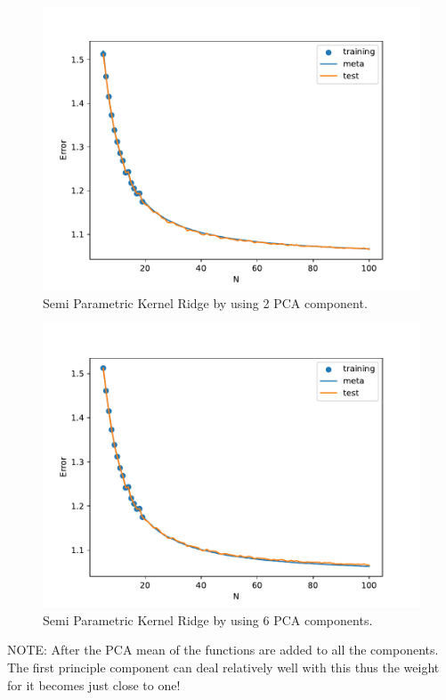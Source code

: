 \documentclass{tran-l}
\theoremstyle{definition}
\theoremstyle{remark}
\numberwithin{equation}{section}
\begin{document}
\begin{figure}[h!]
   \centering
   \includegraphics[width=\textwidth]{Figures/initial_study/lr_2_pca.pdf}
   \caption{Semi Parametric Kernel Ridge by using 2 PCA component. }
\end{figure}

\begin{figure}[h!]
   \centering
   \includegraphics[width=\textwidth]{Figures/initial_study/lr_6_pca.pdf}
   \caption{Semi Parametric Kernel Ridge by using 6 PCA components. }
\end{figure}

NOTE: After the PCA mean of the functions are added to all the components.  The first principle component can deal relatively well with this thus the weight for it becomes just close to one! 
\end{document}
